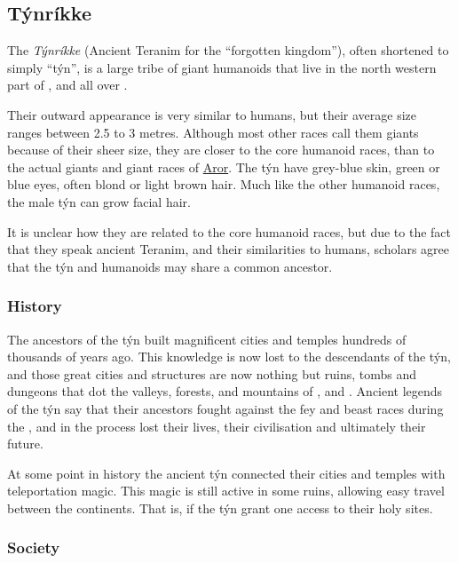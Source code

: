 \subsection{Týnríkke}
\label{sec:Tynrikke}

The \emph{Týnríkke} (Ancient Teranim for the ``forgotten kingdom''), often
shortened to simply ``týn'', is a large tribe of giant humanoids that live in
the north western part of , and all over
.

Their outward appearance is very similar to humans, but their average size
ranges between 2.5 to 3 metres. Although most other races call them giants
because of their sheer size, they are closer to the core humanoid races, than
to the actual giants and giant races of \hyperref[sec:Aror]{Aror}. The týn
have grey-blue skin, green or blue eyes, often blond or light brown hair.
Much like the other humanoid races, the male týn can grow facial hair.

It is unclear how they are related to the core humanoid races, but due to the
fact that they speak ancient Teranim, and their similarities to humans,
scholars agree that the týn and humanoids may share a common ancestor.

\subsubsection{History}

The ancestors of the týn built magnificent cities and temples hundreds of
thousands of years ago. This knowledge is now lost to the descendants of the
týn, and those great cities and structures are now nothing but ruins, tombs
and dungeons that dot the valleys, forests, and mountains of
,  and
. Ancient legends of the týn say that their ancestors
fought against the fey and beast races during the , and in
the process lost their lives, their civilisation and ultimately their future.

At some point in history the ancient týn connected their cities and temples
with teleportation magic. This magic is still active in some ruins, allowing
easy travel between the continents. That is, if the týn grant one access to
their holy sites.

\subsubsection{Society}

